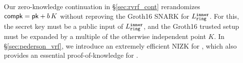 Our zero-knowledge continuation in \S\ref{sec:rvrf_cont} rerandomizes
$\mathsf{compk} = \mathsf{pk} + b \, K$ without reproving the Groth16 SNARK for $L_{\mathtt{ring}}^{\mathtt{inner}}$.
For this, the secret key \sk must be a public input of $L_{\mathtt{ring}}^{\mathtt{inner}}$, and
the Groth16 trusted setup must be expanded by a multiple of
 the otherwise independent point $K$.
%
In \S\ref{sec:pederson_vrf}, we introduce an extremely efficient NIZK
for \Leval, which also provides an essential proof-of-knowledge for \compk.


\endinput


Ring VRFs are firstly ring signatures broadly interpreted, in that they
prove an involved public key lies inside some commitment \comring to
the plausible signer set, known as the ring.
Anyone could compute \comring from this set of public keys.
%
At the same time, ring VRFs prove correct output of a PRF keyed by
the signer's actual secret key, and evaluated on a supplied message \msg,
which then links ring VRF signatures on the same \msg.

\smallskip
